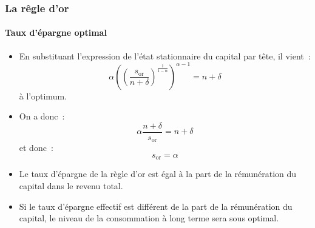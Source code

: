 \documentclass[10pt,notheorems]{beamer}
\theoremstyle{plain}
\theoremstyle{definition} %
\begin{document}
\begin{frame}
  \frametitle{La rêgle d'or}
  \framesubtitle{Taux d'épargne optimal}

  \bigskip

  \begin{itemize}

  \item En substituant l'expression de l'état stationnaire du capital par tête, il vient~:
    \[
      \alpha \left(\left(\frac{s_{\mathrm{or}}}{n+\delta}\right)^{\frac{1}{1-\alpha}}\right)^{\alpha-1} = n+\delta
    \]
    à l'optimum.\newline

  \item On a donc~:
    \[
      \alpha \frac{n+\delta}{s_{\mathrm{or}}} = n+\delta
    \]
    et donc~:
    \[
      s_{\mathrm{or}} = \alpha
    \]

    \bigskip

  \item Le taux d'épargne de la règle d'or est égal à la part de la rémunération du capital dans le revenu total.\newline

  \item Si le taux d'épargne effectif est différent de la part de la rémunération du capital, le niveau de la consommation à long terme sera sous optimal.

  \end{itemize}

\end{frame}
\end{document}
